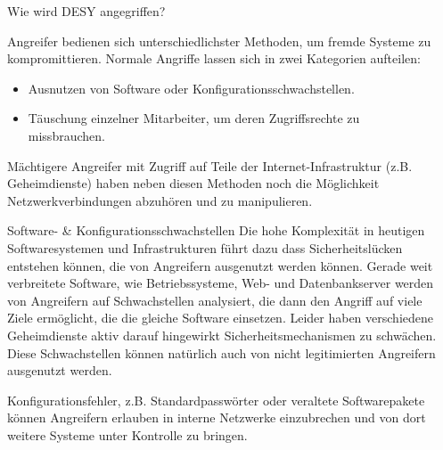 \documentclass[final]{beamer}
\newlength{\sepwid}
\newlength{\twocolwid}
\begin{document}
\begin{frame}[t]
\begin{columns}[t, totalwidth=\textwidth]
\begin{column}{\twocolwid}
\begin{column}{\sepwid}\end{column} %


\begin{block}{Wie wird DESY angegriffen?}

Angreifer bedienen sich unterschiedlichster Methoden, um fremde Systeme zu 
kompromittieren. Normale Angriffe lassen sich in zwei Kategorien aufteilen:

\begin{itemize}
 \item Ausnutzen von Software oder Konfigurationsschwachstellen.
 \item Täuschung einzelner Mitarbeiter, um deren Zugriffsrechte zu missbrauchen.
\end{itemize}

Mächtigere Angreifer mit Zugriff auf Teile der Internet-Infrastruktur 
(z.B. Geheimdienste) haben neben diesen Methoden noch die Möglichkeit 
Netzwerkverbindungen abzuhören und zu manipulieren.

\end{block}

\begin{block}{Software- \& Konfigurationsschwachstellen}
 Die hohe Komplexität in heutigen Softwaresystemen und Infrastrukturen führt dazu dass
 Sicherheitslücken entstehen können, die von Angreifern ausgenutzt werden können. 
 Gerade weit verbreitete Software, wie Betriebssysteme, Web- und Datenbankserver werden 
 von Angreifern auf Schwachstellen analysiert, die dann den Angriff auf viele Ziele ermöglicht, 
 die die gleiche Software einsetzen. Leider haben verschiedene Geheimdienste aktiv darauf 
 hingewirkt Sicherheitsmechanismen zu schwächen. Diese Schwachstellen können natürlich auch 
 von nicht legitimierten Angreifern ausgenutzt werden.
 \par
 Konfigurationsfehler, z.B. Standardpasswörter oder veraltete Softwarepakete können
 Angreifern erlauben in interne Netzwerke einzubrechen und von dort weitere Systeme 
 unter Kontrolle zu bringen.
\end{block}


\end{column} %

\begin{column}{\sepwid}\end{column} %


\end{columns}
\end{frame}
\end{document}
